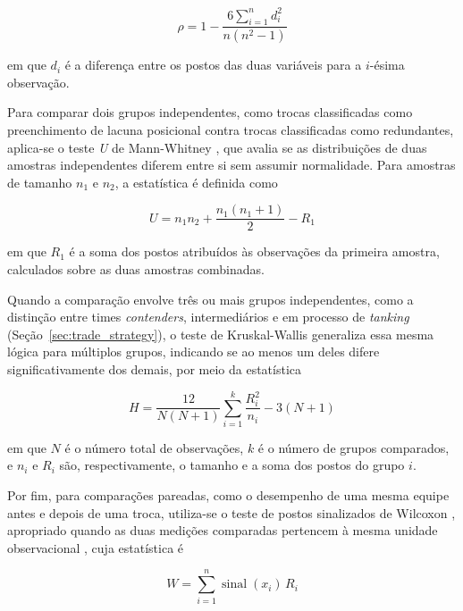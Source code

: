 \begin{equation}
\rho = 1 - \frac{6\sum_{i=1}^{n} d_i^2}{n(n^2-1)}
\label{eq:spearman}
\end{equation}

em que $d_i$ é a diferença entre os postos das duas variáveis para a $i$-ésima observação.

Para comparar dois grupos independentes, como trocas classificadas como preenchimento de lacuna posicional contra trocas classificadas como redundantes, aplica-se o teste \textit{U} de Mann-Whitney \citep{mannwhitney1947}, que avalia se as distribuições de duas amostras independentes diferem entre si sem assumir normalidade. Para amostras de tamanho $n_1$ e $n_2$, a estatística é definida como

\begin{equation}
U = n_1 n_2 + \frac{n_1(n_1+1)}{2} - R_1
\label{eq:mannwhitney}
\end{equation}

em que $R_1$ é a soma dos postos atribuídos às observações da primeira amostra, calculados sobre as duas amostras combinadas.

Quando a comparação envolve três ou mais grupos independentes, como a distinção entre times \textit{contenders}, intermediários e em processo de \textit{tanking} (Seção~\ref{sec:trade_strategy}), o teste de Kruskal-Wallis \citep{kruskalwallis1952} generaliza essa mesma lógica para múltiplos grupos, indicando se ao menos um deles difere significativamente dos demais, por meio da estatística

\begin{equation}
H = \frac{12}{N(N+1)} \sum_{i=1}^{k} \frac{R_i^2}{n_i} - 3(N+1)
\label{eq:kruskalwallis}
\end{equation}

em que $N$ é o número total de observações, $k$ é o número de grupos comparados, e $n_i$ e $R_i$ são, respectivamente, o tamanho e a soma dos postos do grupo $i$.

Por fim, para comparações pareadas, como o desempenho de uma mesma equipe antes e depois de uma troca, utiliza-se o teste de postos sinalizados de Wilcoxon \citep{wilcoxon1945}, apropriado quando as duas medições comparadas pertencem à mesma unidade observacional \citep{siegelcastellan1988}, cuja estatística é

\begin{equation}
W = \sum_{i=1}^{n} \operatorname{sinal}(x_i) \, R_i
\label{eq:wilcoxon}
\end{equation}

